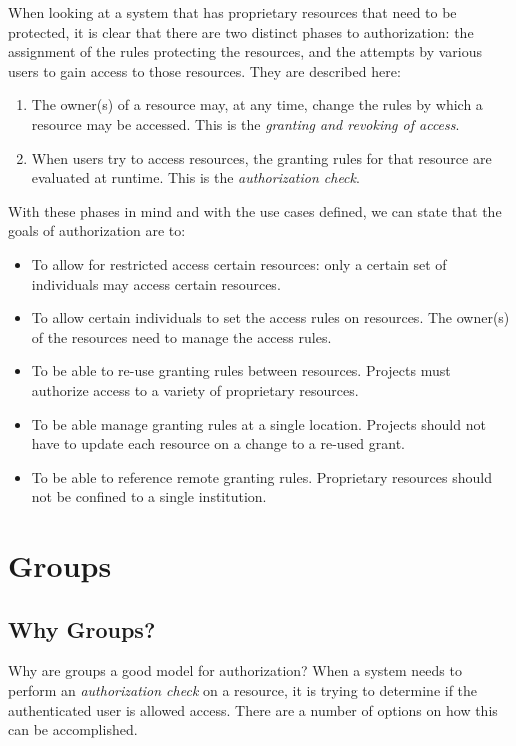 \documentclass[11pt,a4paper]{ivoa}
\begin{document}
When looking at a system that has proprietary resources that need to be protected, it is clear that there are two distinct phases to authorization:  the assignment of the rules protecting the resources, and the attempts by various users to gain access to those resources.  They are described here:

\begin{enumerate}
\item The owner(s) of a resource may, at any time, change the rules by which a resource may be accessed. This is the \emph{granting and revoking of access}.
\item When users try to access resources, the granting rules for that resource are evaluated at runtime. This is the \emph{authorization check}.
\end{enumerate}

With these phases in mind and with the use cases defined, we can state that the goals of authorization are to:

\begin{itemize}
\item To allow for restricted access certain resources: only a certain set of individuals may access certain resources.
\item To allow certain individuals to set the access rules on resources.  The owner(s) of the resources need to manage the access rules.
\item To be able to re-use granting rules between resources.  Projects must authorize access to a variety of proprietary resources.
\item To be able manage granting rules at a single location.  Projects should not have to update each resource on a change to a re-used grant.
\item To be able to reference remote granting rules.  Proprietary resources should not be confined to a single institution.
\end{itemize}

\section{Groups}

\subsection{Why Groups?}

Why are groups a good model for authorization?  When a system needs to perform an \emph{authorization check} on a resource, it is trying to determine if the authenticated user is allowed access.  There are a number of options on how this can be accomplished.
\end{document}

